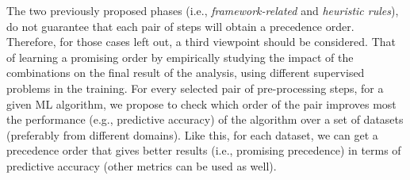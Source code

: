 The two previously proposed phases (i.e., \textit{framework-related} and \textit{heuristic rules}), do not guarantee that each pair of steps will obtain a precedence order.
Therefore, for those cases left out, a third viewpoint should be considered.
That of learning a promising order by empirically studying the impact of the combinations on the final result of the analysis, using different supervised problems in the training.
For every selected pair of pre-processing steps, for a given ML algorithm, we propose to check which order of the pair improves most the performance (e.g., predictive accuracy) of the algorithm over a set of datasets (preferably from different domains).
Like this, for each dataset, we can get a precedence order that gives better results (i.e., promising precedence) in terms of predictive accuracy (other metrics can be used as well).


